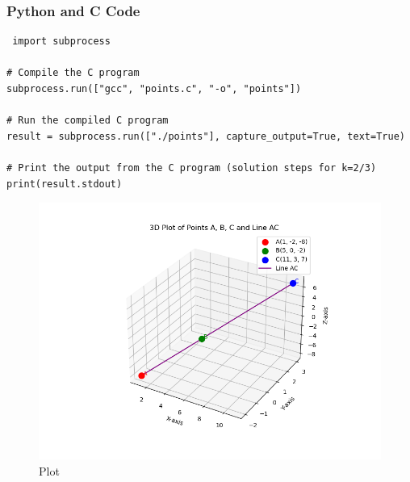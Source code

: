 \documentclass{beamer}
\begin{document}
\begin{frame}[fragile]
\frametitle{Python and C Code}

\begin{lstlisting}
 import subprocess

# Compile the C program
subprocess.run(["gcc", "points.c", "-o", "points"])

# Run the compiled C program
result = subprocess.run(["./points"], capture_output=True, text=True)

# Print the output from the C program (solution steps for k=2/3)
print(result.stdout) 

\end{lstlisting}

\end{frame}

 


\begin{figure}
    \centering
    \includegraphics[width=0.8\columnwidth]{Fig.png}
    \caption{Plot}
    \label{fig:placeholder}
\end{figure}
\end{document}
